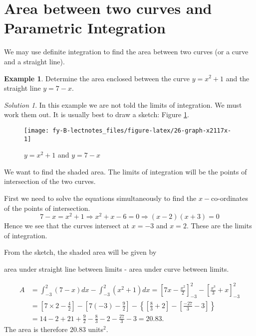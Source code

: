 \documentclass[
  11pt,
  oneside]{book}
\newcommand{\slide}{}
\theoremstyle{definition}
\theoremstyle{definition}
\newtheorem{example}{Example}[chapter]
\theoremstyle{definition}
\theoremstyle{definition}
\theoremstyle{remark}
\newtheorem*{solution}{Solution}
\begin{document}
\slide

\section{Area between two curves and Parametric Integration}\label{area-between-two-curves-and-parametric-integration}

We may use definite integration to find the area between two curves (or a curve and a straight line).

\begin{example}
Determine the area enclosed between the curve \(y=x^2+1\) and the straight line \(y=7-x\).
\end{example}

\begin{solution}
\leavevmode

In this example we are not told the limits of integration. We must work them out. It is usually best to draw a sketch: Figure \ref{fig:26-graph-x2117x}.

\begin{figure}

{\centering \texttt{[image: fy-B-lectnotes\_files/figure-latex/26-graph-x2117x-1]} 

}

\caption{$y=x^2+1$ and $y=7-x$}\label{fig:26-graph-x2117x}
\end{figure}

We want to find the shaded area. The limits of integration will be the points of intersection of the two curves.

First we need to solve the equations simultaneously to find the \(x-\)co-ordinates of the points of intersection.
\[
7-x=x^2+1\Rightarrow x^2+x-6=0\Rightarrow (x-2)(x+3)=0
\]
Hence we see that the curves intersect at \(x=-3\) and \(x=2\). These are the limits of integration.

From the sketch, the shaded area will be given by

\begin{center}
area under straight line between limits - area under curve between limits.
\end{center}

\begin{align*}
A&=\int_{-3}^2(7-x)dx - \int_{-3}^2(x^2+1)dx = \left[7x-\frac{x^2}2\right]_{-3}^2 - \left[\frac{x^3}3+x\right]_{-3}^2\\
&=\left[7\times2-\frac{4}2\right]-\left[7(-3)-\frac92\right]-\left\{\left[\frac{8}3+2\right]-\left[\frac{-27}3-3\right]\right\}\\
&=14-2+21+\frac 92-\frac83-2-\frac{27}3-3=20.83.
\end{align*}
The area is therefore \(20.83\) units\(^2\).

\end{solution}
\end{document}
